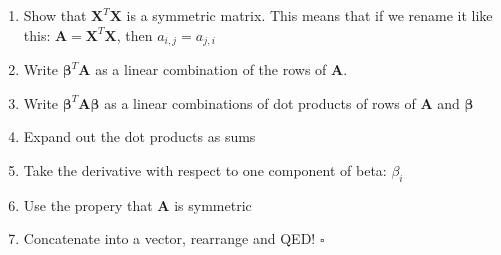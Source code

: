 \documentclass[11pt]{article}
\newcommand\xmtx{\boldsymbol{X}}
\newcommand\amtx{\boldsymbol{A}}
\newcommand\betavec{\boldsymbol{\beta}}
\begin{document}
\begin{enumerate}
    \item Show that $\xmtx^T \xmtx$ is a symmetric matrix.  This means that if
        we rename it like this: $\amtx = \xmtx^T \xmtx$, then $a_{i,j} = a_{j,i}$
    \item Write $\betavec^T \amtx$ as a linear combination of the rows
        of $\amtx$.
    \item Write $\betavec^T \amtx \betavec$ as a linear combinations of
        dot products of rows of $\amtx$ and $\betavec$
    \item Expand out the dot products as sums
    \item Take the derivative with respect to one component of beta:
        $\beta_i$
    \item Use the propery that $\amtx$ is symmetric
    \item Concatenate into a vector, rearrange and QED! $\square$
\end{enumerate}
\end{document}
